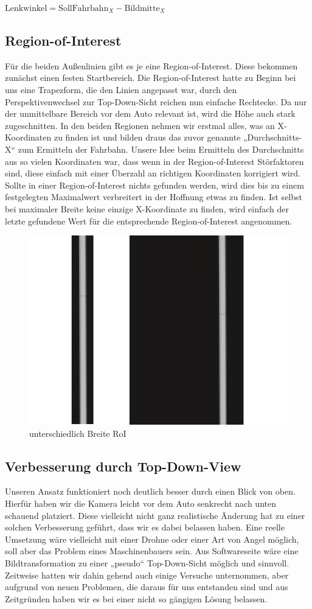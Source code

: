 \begin{center}
$\text{Lenkwinkel} = \text{SollFahrbahn}_X - \text{Bildmitte}_X$
\end{center}


\subsection{Region-of-Interest}
Für die beiden Außenlinien gibt es je eine Region-of-Interest. Diese bekommen zunächst einen festen Startbereich. Die Region-of-Interest hatte zu Beginn bei uns eine Trapezform, die den  Linien angepasst war, durch den Perspektivenwechsel zur Top-Down-Sicht reichen nun einfache Rechtecke. Da nur der unmittelbare Bereich vor dem Auto relevant ist, wird die Höhe auch stark zugeschnitten. In den beiden Regionen nehmen wir erstmal alles, was an X-Koordinaten zu finden ist und bilden draus das zuvor genannte „Durchschnitts-X“ zum Ermitteln der Fahrbahn. Unsere Idee beim Ermitteln des Durchschnitts aus so vielen Koordinaten war, dass wenn in der Region-of-Interest Störfaktoren sind, diese einfach mit einer Überzahl an richtigen Koordinaten korrigiert wird. Sollte in einer Region-of-Interest nichts gefunden werden, wird dies bis zu einem festgelegten Maximalwert verbreitert in der Hoffnung etwas zu finden. Ist selbst bei maximaler Breite keine einzige X-Koordinate zu finden, wird einfach der letzte gefundene Wert für die entsprechende Region-of-Interest angenommen.

\begin{figure}[H]
	\centering	
	\includegraphics[width=.4\textwidth]{img/roi_breite}
	\caption[unterschiedlich Breite RoI]{unterschiedlich Breite RoI}
	\label{fig:vector_kurve}
\end{figure}

\subsection{Verbesserung durch Top-Down-View}
Unseren Ansatz funktioniert noch deutlich besser durch einen Blick von oben. Hierfür haben wir die Kamera leicht vor dem Auto senkrecht nach unten schauend platziert. Diese vielleicht nicht ganz realistische Änderung hat zu einer solchen Verbesserung geführt, dass wir es dabei belassen haben. Eine reelle Umsetzung wäre vielleicht mit einer Drohne oder einer Art von Angel möglich, soll aber das Problem eines Maschinenbauers sein. Aus Softwareseite wäre eine Bildtransformation zu einer „pseudo“ Top-Down-Sicht möglich und sinnvoll. Zeitweise hatten wir dahin gehend auch einige Versuche unternommen, aber aufgrund von neuen Problemen, die daraus für uns entstanden sind und aus Zeitgründen haben wir es bei einer nicht so gängigen Lösung belassen.

